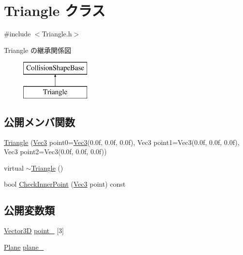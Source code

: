 \hypertarget{class_triangle}{}\section{Triangle クラス}
\label{class_triangle}


{\ttfamily \#include $<$Triangle.\+h$>$}

Triangle の継承関係図\begin{figure}[H]
\begin{center}
\leavevmode
\includegraphics[height=2.000000cm]{class_triangle}
\end{center}
\end{figure}
\subsection*{公開メンバ関数}
\begin{DoxyCompactItemize}
\item 
\mbox{\hyperlink{class_triangle_a2d96bc16d87b0ece2fef7325d63969b3}{Triangle}} (\mbox{\hyperlink{_vector3_d_8h_ab16f59e4393f29a01ec8b9bbbabbe65d}{Vec3}} point0=\mbox{\hyperlink{_vector3_d_8h_ab16f59e4393f29a01ec8b9bbbabbe65d}{Vec3}}(0.\+0f, 0.\+0f, 0.\+0f), Vec3 point1=\+Vec3(0.\+0f, 0.\+0f, 0.\+0f), Vec3 point2=\+Vec3(0.\+0f, 0.\+0f, 0.\+0f))
\item 
virtual \mbox{\hyperlink{class_triangle_a5199760a17454f4dc94c855a57e3a152}{$\sim$\+Triangle}} ()
\item 
bool \mbox{\hyperlink{class_triangle_ac5d6a4c5f2bfda5cdc56c89a294fb46e}{Check\+Inner\+Point}} (\mbox{\hyperlink{_vector3_d_8h_ab16f59e4393f29a01ec8b9bbbabbe65d}{Vec3}} point) const
\end{DoxyCompactItemize}
\subsection*{公開変数類}
\begin{DoxyCompactItemize}
\item 
\mbox{\hyperlink{class_vector3_d}{Vector3D}} \mbox{\hyperlink{class_triangle_ab25f2be0ff148b58f1db904ad050353e}{point\+\_\+}} \mbox{[}3\mbox{]}
\item 
\mbox{\hyperlink{class_plane}{Plane}} \mbox{\hyperlink{class_triangle_a93586199c2c173771f2e167f477eaa70}{plane\+\_\+}}
\end{DoxyCompactItemize}
